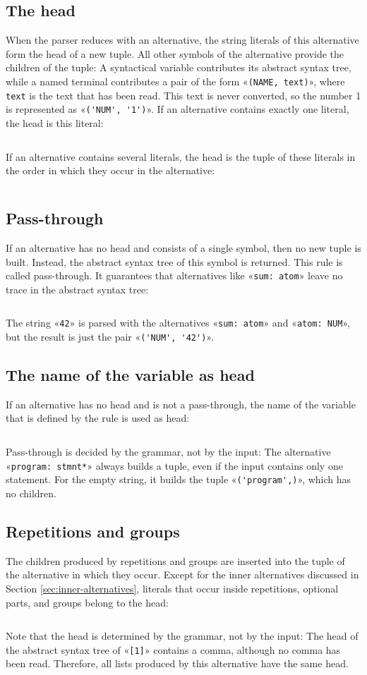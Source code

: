 \documentclass[11pt,a4paper]{article}
\newcommand{\blue}[1]{{\color{blue}#1}}
\newenvironment{unbreakable}{\par\noindent\begin{minipage}{\linewidth}}{\end{minipage}\par}
\newcommand{\resultfile}[2][\normalsize]{\begin{unbreakable}%
  \inputminted[fontsize = #1, breaklines]{text}{examples/output/#2.txt}\end{unbreakable}}
\begin{document}
\subsection{The head}
When the parser reduces with an alternative, the string literals of this alternative form the
\blue{head} of a new tuple.  All other symbols of the alternative provide the \blue{children} of the
tuple:  A syntactical variable contributes its abstract syntax tree, while a named terminal contributes a pair
of the form «\verb|(NAME, text)|», where \texttt{text} is the text that has been read.  This text is never
converted, so the number 1 is represented as «\verb|('NUM', '1')|».  If an alternative contains exactly one
literal, the head is this literal:
\resultfile{shapes-head}
If an alternative contains several literals, the head is the tuple of these literals in the order in which
they occur in the alternative:
\resultfile{shapes-heads}

\subsection{Pass-through}
If an alternative has no head and consists of a single symbol, then no new tuple is built.  Instead, the
abstract syntax tree of this symbol is returned.  This rule is called \blue{pass-through}.  It guarantees that
alternatives like «\verb|sum: atom|» leave no trace in the abstract syntax tree:
\resultfile{shapes-pass-through}
The string «\texttt{42}» is parsed with the alternatives «\verb|sum: atom|» and «\verb|atom: NUM|», but the result is
just the pair «\verb|('NUM', '42')|».

\subsection{The name of the variable as head}
If an alternative has no head and is not a pass-through, the name of the variable that is defined by the rule is
used as head:
\resultfile{shapes-rule-name}
Pass-through is decided by the grammar, not by the input:  The alternative «\verb|program: stmnt*|»
always builds a tuple, even if the input contains only one statement.  For the empty string, it builds the
tuple «\verb|('program',)|», which has no children.

\subsection{Repetitions and groups}
The children produced by repetitions and groups are inserted into the tuple of the alternative in which they
occur.  Except for the inner alternatives discussed in Section \ref{sec:inner-alternatives}, literals that
occur inside repetitions, optional parts, and groups belong to the head:
\resultfile{shapes-flatten}
Note that the head is determined by the grammar, not by the input:  The head of the abstract syntax tree of
«\texttt{[1]}» contains a comma, although no comma has been read.  Therefore, all lists produced by this
alternative have the same head.
\end{document}
